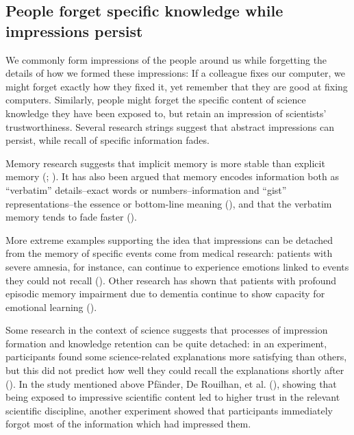 \documentclass[
  jou,
  floatsintext,
  longtable,
  nolmodern,
  notxfonts,
  notimes,
  colorlinks=true,linkcolor=blue,citecolor=blue,urlcolor=blue]{apa7}
\begin{document}
\subsection{People forget specific knowledge while impressions
persist}\label{people-forget-specific-knowledge-while-impressions-persist}

We commonly form impressions of the people around us while forgetting
the details of how we formed these impressions: If a colleague fixes our
computer, we might forget exactly how they fixed it, yet remember that
they are good at fixing computers. Similarly, people might forget the
specific content of science knowledge they have been exposed to, but
retain an impression of scientists' trustworthiness. Several research
strings suggest that abstract impressions can persist, while recall of
specific information fades.

Memory research suggests that implicit memory is more stable than
explicit memory
(; ). It has also been argued that memory encodes information both as
``verbatim'' details--exact words or numbers--information and ``gist''
representations--the essence or bottom-line meaning
(), and that
the verbatim memory tends to fade faster
().

More extreme examples supporting the idea that impressions can be
detached from the memory of specific events come from medical research:
patients with severe amnesia, for instance, can continue to experience
emotions linked to events they could not recall
(). Other research has shown that patients with profound
episodic memory impairment due to dementia continue to show capacity for
emotional learning
().

Some research in the context of science suggests that processes of
impression formation and knowledge retention can be quite detached: in
an experiment, participants found some science-related explanations more
satisfying than others, but this did not predict how well they could
recall the explanations shortly after
(). In the study mentioned above Pfänder, De Rouilhan, et al.
(), showing
that being exposed to impressive scientific content led to higher trust
in the relevant scientific discipline, another experiment showed that
participants immediately forgot most of the information which had
impressed them.
\end{document}
